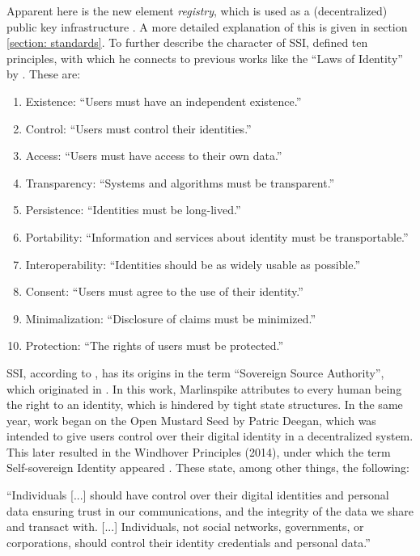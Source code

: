         Apparent here is the new element \textit{registry}, which is used as a (decentralized) public key infrastructure \cite[p. 89]{preukschat_self-sovereign_2021}. A more detailed explanation of this is given in section \ref{section: standards}. To further describe the character of \ac{SSI}, \cite{allen_path_2016} defined ten principles, with which he connects to previous works like the “Laws of Identity” by \cite{cameron_laws_2005}. These are:
        
        \begin{enumerate}
        	\item Existence: “Users must have an independent existence.”
        	\item Control: “Users must control their identities.”
        	\item Access: “Users must have access to their own data.”
        	\item Transparency: “Systems and algorithms must be transparent.”
        	\item Persistence: “Identities must be long-lived.”
        	\item Portability: “Information and services about identity must be transportable.”
        	\item Interoperability: “Identities should be as widely usable as possible.”
        	\item Consent: “Users must agree to the use of their identity.”
        	\item Minimalization: “Disclosure of claims must be minimized.”
        	\item Protection: “The rights of users must be protected.”
        \end{enumerate}
	    
	    SSI, according to \cite{allen_path_2016}, has its origins in the term “Sovereign Source Authority”, which originated in \cite{marlinspike_what_2012}. In this work, Marlinspike attributes to every human being the right to an identity, which is hindered by tight state structures. In the same year, work began on the Open Mustard Seed by Patric Deegan, which was intended to give users control over their digital identity in a decentralized system. This later resulted in the Windhover Principles (2014), under which the term Self-sovereign Identity appeared \cite{idcubedorg_windhover_2014, hub_culture_hubid_2014}. These state, among other things, the following: \cite{allen_path_2016}
	    
	    \begin{displayquote}
            “Individuals [...] should have control over their digital identities and personal data ensuring trust in our communications, and the integrity of the data we share and transact with. [...] Individuals, not social networks, governments, or corporations, should control their identity credentials and personal data.”
        \end{displayquote}
        
